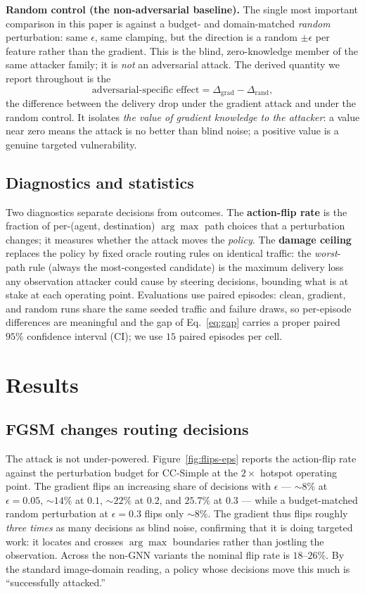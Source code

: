 \documentclass[10pt,journal,comsoc]{IEEEtran}
\begin{document}
\textbf{Random control (the non-adversarial baseline).} The single most important
comparison in this paper is against a budget- and domain-matched \emph{random}
perturbation: same $\epsilon$, same clamping, but the direction is a random
$\pm\epsilon$ per feature rather than the gradient. This is the blind, zero-knowledge
member of the same attacker family; it is \emph{not} an adversarial attack. The
derived quantity we report throughout is the
\begin{equation}
\text{adversarial-specific effect} = \Delta_{\text{grad}} - \Delta_{\text{rand}},
\label{eq:gap}
\end{equation}
the difference between the delivery drop under the gradient attack and under the
random control. It isolates \emph{the value of gradient knowledge to the attacker}:
a value near zero means the attack is no better than blind noise; a positive value
is a genuine targeted vulnerability.

\subsection{Diagnostics and statistics}
Two diagnostics separate decisions from outcomes. The \textbf{action-flip rate} is
the fraction of per-(agent, destination) $\arg\max$ path choices that a perturbation
changes; it measures whether the attack moves the \emph{policy}. The \textbf{damage
ceiling} replaces the policy by fixed oracle routing rules on identical traffic:
the \emph{worst}-path rule (always the most-congested candidate) is the maximum
delivery loss any observation attacker could cause by steering decisions, bounding
what is at stake at each operating point. Evaluations use paired episodes: clean,
gradient, and random runs share the same seeded traffic and failure draws, so
per-episode differences are meaningful and the gap of Eq.~\eqref{eq:gap} carries a
proper paired $95\%$ confidence interval (CI); we use $15$ paired episodes per cell.

\section{Results}
\label{sec:results}

\subsection{FGSM changes routing decisions}
\label{sec:flips}
The attack is not under-powered. Figure~\ref{fig:flips-eps} reports the action-flip
rate against the perturbation budget for CC-Simple at the $2\times$ hotspot operating
point. The gradient flips an increasing share of decisions with $\epsilon$ ---
${\sim}8\%$ at $\epsilon{=}0.05$, ${\sim}14\%$ at $0.1$, ${\sim}22\%$ at $0.2$, and
$25.7\%$ at $0.3$ --- while a budget-matched random perturbation at $\epsilon{=}0.3$
flips only ${\sim}8\%$. The gradient thus flips roughly \emph{three times} as many
decisions as blind noise, confirming that it is doing targeted work: it locates and
crosses $\arg\max$ boundaries rather than jostling the observation. Across the
non-GNN variants the nominal flip rate is $18$--$26\%$. By the standard image-domain
reading, a policy whose decisions move this much is ``successfully attacked.''
\end{document}
